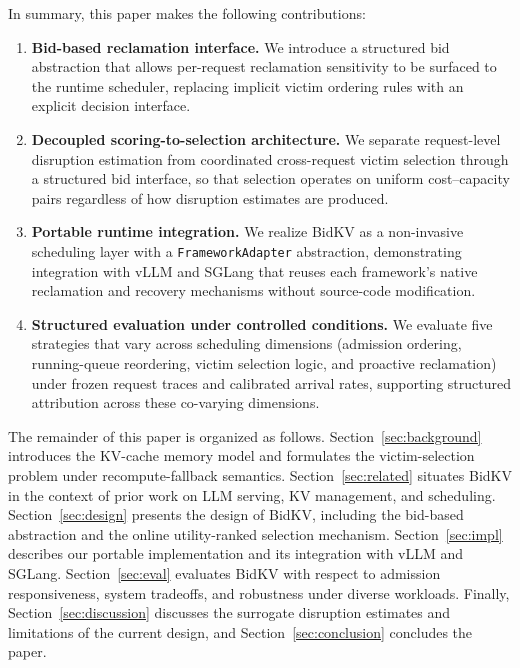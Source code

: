 \documentclass[sigconf,nonacm]{acmart}
\newcommand{\bidkv}{BidKV\xspace}
\begin{document}
In summary, this paper makes the following contributions:
\begin{enumerate}[leftmargin=*,nosep]
\item \textbf{Bid-based reclamation interface.}
  We introduce a structured bid abstraction that allows per-request
  reclamation sensitivity to be surfaced to the runtime scheduler, replacing
  implicit victim ordering rules with an explicit decision interface.

\item \textbf{Decoupled scoring-to-selection architecture.}
  We separate request-level disruption estimation from coordinated
  cross-request victim selection through a structured bid interface,
  so that selection operates on uniform cost--capacity pairs regardless
  of how disruption estimates are produced.

\item \textbf{Portable runtime integration.}
  We realize \bidkv as a non-invasive scheduling layer with a
  \texttt{Framework\-Adapter} abstraction, demonstrating integration with
  vLLM and SGLang that reuses each framework's native reclamation and
  recovery mechanisms without source-code modification.

\item \textbf{Structured evaluation under controlled conditions.}
  We evaluate five strategies that vary across scheduling dimensions
  (admission ordering, running-queue reordering, victim selection logic,
  and proactive reclamation) under frozen request traces and calibrated
  arrival rates, supporting structured attribution across these co-varying
  dimensions.
\end{enumerate}

The remainder of this paper is organized as follows.
Section~\ref{sec:background} introduces the KV-cache memory model and formulates the victim-selection problem under recompute-fallback semantics.
Section~\ref{sec:related} situates \bidkv in the context of prior work on LLM serving, KV management, and scheduling.
Section~\ref{sec:design} presents the design of \bidkv, including the bid-based abstraction and the online utility-ranked selection mechanism.
Section~\ref{sec:impl} describes our portable implementation and its integration with vLLM and SGLang.
Section~\ref{sec:eval} evaluates \bidkv with respect to admission responsiveness, system tradeoffs, and robustness under diverse workloads.
Finally, Section~\ref{sec:discussion} discusses the surrogate disruption estimates and limitations of the current design, and Section~\ref{sec:conclusion} concludes the paper.
\end{document}
